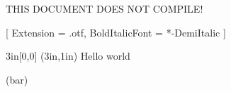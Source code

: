 \documentclass{minimal}
\begin{document}
THIS DOCUMENT DOES NOT COMPILE!

\setmainfont{LucidaBrightOT}[
  Extension = .otf,
  BoldItalicFont = *-DemiItalic
]

\begin{helloworld}[
  Extension = .otf,
  BoldItalicFont = *-DemiItalic
]
\end{helloworld}

\begin{textblock*}{3in}[0,0] (3in,1in)
  Hello world
\end{textblock*}

\test \foo(bar)
\end{document}

